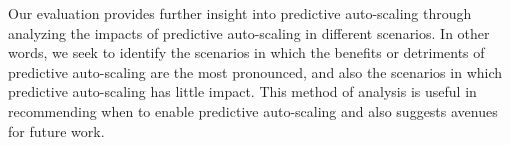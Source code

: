 Our evaluation provides further insight into predictive auto-scaling
through analyzing the impacts of predictive auto-scaling in different scenarios.
In other words, we seek to identify the scenarios in which the benefits or
detriments of predictive auto-scaling are the most pronounced, and also the
scenarios in which predictive auto-scaling has little impact. This method of
analysis is useful in recommending when to enable predictive auto-scaling
and also suggests avenues for future work.
